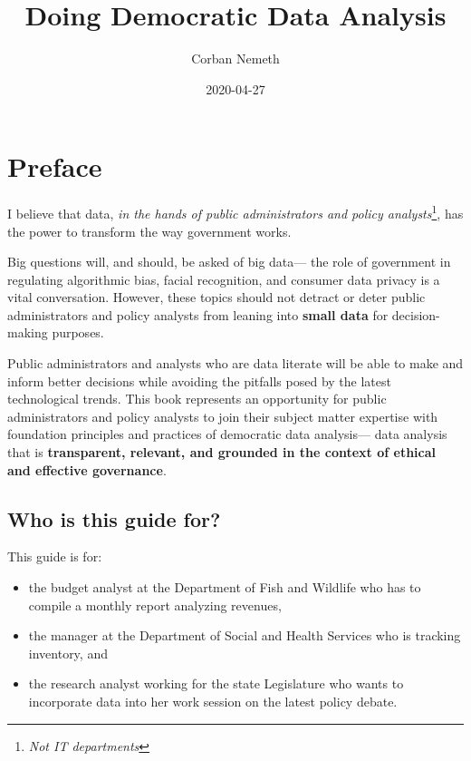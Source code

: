 \documentclass[]{book}
\title{Doing Democratic Data Analysis}
\author{Corban Nemeth}
\date{2020-04-27}
\providecommand{\tightlist}{%
  \setlength{\itemsep}{0pt}\setlength{\parskip}{0pt}}
\begin{document}
\maketitle

{
\setcounter{tocdepth}{1}
\tableofcontents
}
\hypertarget{preface}{%
\chapter*{Preface}\label{preface}}

I believe that data, \emph{in the hands of public administrators and policy analysts}\footnote{\emph{Not IT departments}}, has the power to transform the way government works.

Big questions will, and should, be asked of big data--- the role of government in regulating algorithmic bias, facial recognition, and consumer data privacy is a vital conversation. However, these topics should not detract or deter public administrators and policy analysts from leaning into \textbf{small data} for decision-making purposes.

Public administrators and analysts who are data literate will be able to make and inform better decisions while avoiding the pitfalls posed by the latest technological trends. This book represents an opportunity for public administrators and policy analysts to join their subject matter expertise with foundation principles and practices of democratic data analysis--- data analysis that is \textbf{transparent, relevant, and grounded in the context of ethical and effective governance}.

\hypertarget{who-is-this-guide-for}{%
\section*{Who is this guide for?}\label{who-is-this-guide-for}}

This guide is for:

\begin{itemize}
\tightlist
\item
  the budget analyst at the Department of Fish and Wildlife who has to compile a monthly report analyzing revenues,
\item
  the manager at the Department of Social and Health Services who is tracking inventory, and
\item
  the research analyst working for the state Legislature who wants to incorporate data into her work session on the latest policy debate.
\end{itemize}
\end{document}

